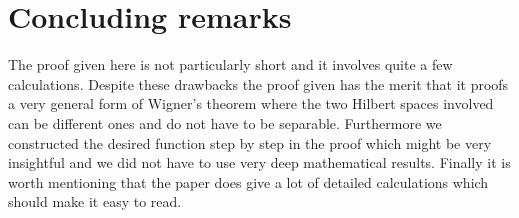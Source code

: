 \section{Concluding remarks}
The proof given here is not particularly short and it involves quite a few calculations. Despite these drawbacks the proof given has the merit that it proofs a very general form of Wigner's theorem where the two Hilbert spaces involved can be different ones and do not have to be separable. Furthermore we constructed the desired function step by step in the proof which might be very insightful and we did not have to use very deep mathematical results. Finally it is worth mentioning that the paper does give a lot of detailed calculations which should make it easy to read.